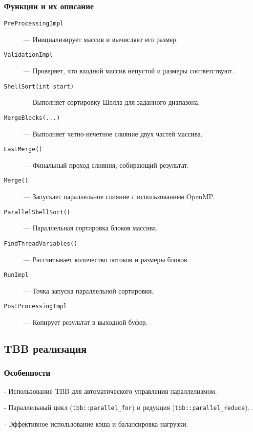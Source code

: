 \documentclass[12pt]{article}
\begin{document}
\subsubsection*{Функции и их описание}
\begin{description}
    \item[\texttt{PreProcessingImpl}] — Инициализирует массив и вычисляет его размер.
    \item[\texttt{ValidationImpl}] — Проверяет, что входной массив непустой и размеры соответствуют.
    \item[\texttt{ShellSort(int start)}] — Выполняет сортировку Шелла для заданного диапазона.
    \item[\texttt{MergeBlocks(...)}] — Выполняет четно-нечетное слияние двух частей массива.
    \item[\texttt{LastMerge()}] — Финальный проход слияния, собирающий результат.
    \item[\texttt{Merge()}] — Запускает параллельное слияние с использованием OpenMP.
    \item[\texttt{ParallelShellSort()}] — Параллельная сортировка блоков массива.
    \item[\texttt{FindThreadVariables()}] — Рассчитывает количество потоков и размеры блоков.
    \item[\texttt{RunImpl}] — Точка запуска параллельной сортировки.
    \item[\texttt{PostProcessingImpl}] — Копирует результат в выходной буфер.
\end{description}

\subsection{TBB реализация}
\subsubsection*{Особенности}

    
- Использование TBB для автоматического управления параллелизмом.
    
- Параллельный цикл (\texttt{tbb::parallel\_for}) и редукция (\texttt{tbb::parallel\_reduce}).
    
- Эффективное использование кэша и балансировка нагрузки.
\end{document}
